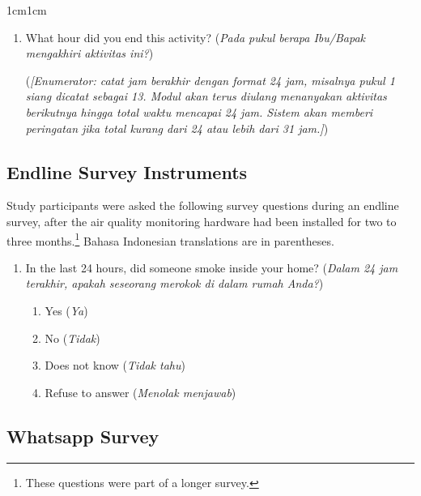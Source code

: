 \documentclass[9pt,twoside]{pnas-new}
\begin{document}
\begin{adjustwidth}{1cm}{1cm}
\begin{enumerate}
\item What hour did you end this activity? (\emph{Pada pukul berapa Ibu/Bapak mengakhiri aktivitas ini?})

     (\emph{[Enumerator: catat jam berakhir dengan format 24 jam, misalnya pukul 1 siang dicatat sebagai 13. Modul akan terus diulang menanyakan aktivitas berikutnya hingga total waktu mencapai 24 jam. Sistem akan memberi peringatan jika total kurang dari 24 atau lebih dari 31 jam.]})

\end{enumerate}

\subsection*{Endline Survey Instruments}

Study participants were asked the following survey questions during an endline survey, after the air quality monitoring hardware had been installed for two to three months.\footnote{These questions were part of a longer survey.} Bahasa Indonesian translations are in parentheses.

\begin{enumerate}
    \item In the last 24 hours, did someone smoke inside your home?	(\textit{Dalam 24 jam terakhir, apakah seseorang merokok di dalam rumah Anda?})
    \begin{enumerate}
        \item Yes (\textit{Ya})
        \item No (\textit{Tidak})
         \item Does not know (\textit{Tidak tahu})
        \item Refuse to answer (\textit{Menolak menjawab})
    \end{enumerate}
    
\end{enumerate}

\subsection*{Whatsapp Survey}


\end{adjustwidth}
\end{document}

